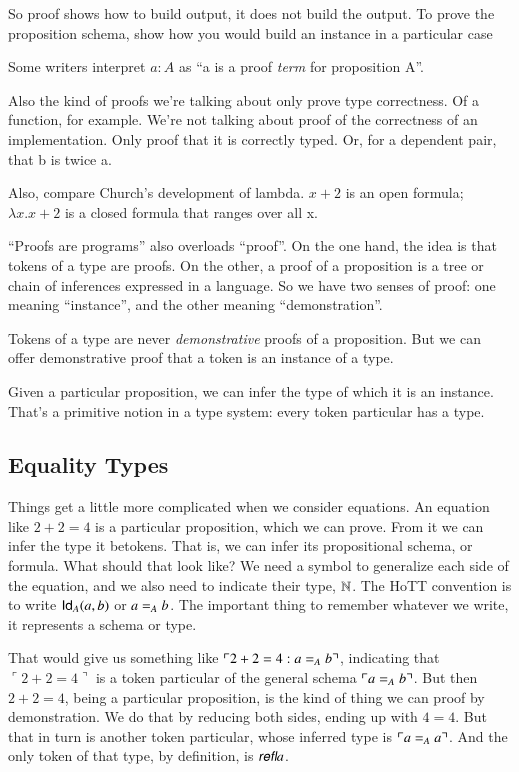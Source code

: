 \documentclass{article}
\begin{document}
So proof shows how to build output, it does not build the output. To
prove the proposition schema, show how you would build an instance in
a particular case

Some writers interpret \(a:A\) as ``a is a proof \textit{term} for
proposition A''.

Also the kind of proofs we're talking about only prove type
correctness. Of a function, for example. We're not talking about proof
of the correctness of an implementation. Only proof that it is correctly
typed.  Or, for a dependent pair, that b is twice a.

Also, compare Church's development of lambda. \(x+2\) is an open
formula; \(\lambda x.x+2\) is a closed formula that ranges over all x.

``Proofs are programs'' also overloads ``proof''. On the one hand, the
idea is that tokens of a type are proofs. On the other, a proof of a
proposition is a tree or chain of inferences expressed in a language.
So we have two senses of proof: one meaning ``instance'', and the
other meaning ``demonstration''.

Tokens of a type are never \textit{demonstrative} proofs of a
proposition. But we can offer demonstrative proof that a token is an
instance of a type.

Given a particular proposition, we can infer the type of which it is
an instance. That's a primitive notion in a type system: every token
particular has a type.

\subsection{Equality Types}

Things get a little more complicated when we consider equations. An
equation like \(2+2=4\) is a particular proposition, which we can
prove. From it we can infer the type it betokens. That is, we can
infer its propositional schema, or formula. What should that look
like? We need a symbol to generalize each side of the equation, and we
also need to indicate their type, \(\Nat\). The HoTT convention is to
write \(\Id{A}{a}{b}\) or \(\Eq{A}{a}{b}\). The important thing to
remember whatever we write, it represents a schema or type.

That would give us something like \(\ulcorner 2+2=4 :
\Eq{A}{a}{b}\urcorner\), indicating that \(\ulcorner 2+2=4\urcorner\)
is a token particular of the general schema
\(\ulcorner\Eq{A}{a}{b}\urcorner\). But then \(2+2=4\), being a
particular proposition, is the kind of thing we can proof by
demonstration. We do that by reducing both sides, ending up with
\(4=4\). But that in turn is another token particular, whose inferred
type is \(\ulcorner\Eq{A}{a}{a}\urcorner\). And the only token of that
type, by definition, is \(\refl{a}\).
\end{document}
